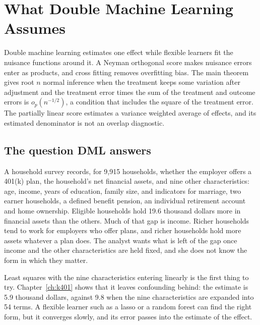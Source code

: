 \chapter{What Double Machine Learning Assumes}\label{ch:dml}

\begin{tcolorbox}[colback=gray!6,colframe=gray!50,title=In brief,fonttitle=\normalfont\itshape,coltitle=black,colbacktitle=gray!15,boxrule=0.4pt,arc=1pt]
Double machine learning estimates one effect while flexible learners fit the nuisance functions around it. A Neyman orthogonal score makes nuisance errors enter as products, and cross fitting removes overfitting bias. The main theorem gives root $n$ normal inference when the treatment keeps some variation after adjustment and the treatment error times the sum of the treatment and outcome errors is $o_p(n^{-1/2})$, a condition that includes the square of the treatment error. The partially linear score estimates a variance weighted average of effects, and its estimated denominator is not an overlap diagnostic.
\end{tcolorbox}

\section{The question DML answers}\label{sec:dml:question}

A household survey records, for 9,915 households, whether the employer offers a 401(k) plan, the household's net financial assets, and nine other characteristics: age, income, years of education, family size, and indicators for marriage, two earner households, a defined benefit pension, an individual retirement account and home ownership. Eligible households hold 19.6 thousand dollars more in financial assets than the others. Much of that gap is income. Richer households tend to work for employers who offer plans, and richer households hold more assets whatever a plan does. The analyst wants what is left of the gap once income and the other characteristics are held fixed, and she does not know the form in which they matter.

Least squares with the nine characteristics entering linearly is the first thing to try. Chapter~\ref{ch:k401} shows that it leaves confounding behind: the estimate is 5.9 thousand dollars, against 9.8 when the nine characteristics are expanded into 54 terms. A flexible learner such as a lasso or a random forest can find the right form, but it converges slowly, and its error passes into the estimate of the effect.

